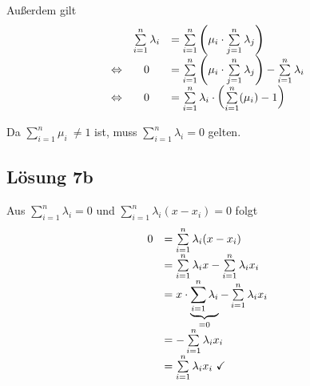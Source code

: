 \documentclass[main.tex]{subfiles}
\begin{document}
Außerdem gilt
\begin{equation*}
    \begin{array}{ c c l }
    & \sum\limits _{i=1}^{n} \lambda _{i} & =\sum\limits _{i=1}^{n}\left( \mu _{i} \cdotp \sum\limits _{j=1}^{n} \lambda _{j}\right)\\
    \Leftrightarrow  & 0 & =\sum\limits _{i=1}^{n}\left( \mu _{i} \cdotp \sum\limits _{j=1}^{n} \lambda _{j}\right) -\sum\limits _{i=1}^{n} \lambda _{i}\\
    \Leftrightarrow  & 0 & =\sum\limits _{i=1}^{n} \lambda _{i} \cdotp \left(\sum\limits _{i=1}^{n}( \mu _{i}) -1\right)
    \end{array}
\end{equation*}

Da $\sum _{i=1}^{n} \mu _{i} \ \neq 1$ ist, muss $\sum\nolimits _{i=1}^{n} \lambda _{i} =0$ gelten.

\subsection{Lösung 7b}

Aus $\sum\nolimits _{i=1}^{n} \lambda _{i} =0$ und $\sum\nolimits _{i=1}^{n} \lambda _{i}( x-x_{i}) =0$ folgt
\begin{equation*}
    \begin{array}{ c l }
    0 & =\sum\limits _{i=1}^{n} \lambda _{i}( x-x_{i})\\
    & =\sum\limits _{i=1}^{n} \lambda _{i} x-\sum\limits _{i=1}^{n} \lambda _{i} x_{i}\\
    & =x\cdotp \underbrace{\sum\limits _{i=1}^{n} \lambda _{i}}_{=0} -\sum\limits _{i=1}^{n} \lambda _{i} x_{i}\\
    & =-\sum\limits _{i=1}^{n} \lambda _{i} x_{i}\\
    & =\sum\limits _{i=1}^{n} \lambda _{i} x_{i} \ \checked 
    \end{array}
\end{equation*}
\end{document}
